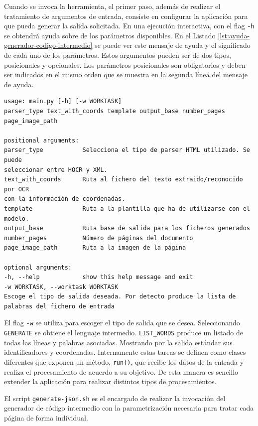 Cuando se invoca la herramienta, el primer paso, además de realizar el tratamiento de argumentos de entrada, consiste en configurar la aplicación para que pueda generar la salida solicitada. En una ejecución interactiva, con el flag \verb|-h| se obtendrá ayuda sobre de los parámetros disponibles. En el Listado \ref{lst:ayuda-generador-codigo-intermedio} se puede ver este mensaje de ayuda y el significado de cada uno de los parámetros. Estos argumentos pueden ser de dos tipos, posicionales y opcionales. Los parámetros posicionales son obligatorios y deben ser indicados en el mismo orden que se muestra en la segunda línea del mensaje de ayuda. 

\begin{lstlisting}[caption={Ayuda del generador de código intermedio.},label=lst:ayuda-generador-codigo-intermedio]
usage: main.py [-h] [-w WORKTASK]
parser_type text_with_coords template output_base number_pages page_image_path

positional arguments:
parser_type           Selecciona el tipo de parser HTML utilizado. Se puede
seleccionar entre HOCR y XML.
text_with_coords      Ruta al fichero del texto extraido/reconocido por OCR
con la información de coordenadas.
template              Ruta a la plantilla que ha de utilizarse con el
modelo.
output_base           Ruta base de salida para los ficheros generados
number_pages          Número de páginas del documento
page_image_path       Ruta a la imagen de la página

optional arguments:
-h, --help            show this help message and exit
-w WORKTASK, --worktask WORKTASK
Escoge el tipo de salida deseada. Por detecto produce la lista de palabras del fichero de entrada
\end{lstlisting}

El flag \verb|-w| se utiliza para escoger el tipo de salida que se desea. Seleccionando \verb|GENERATE| se obtiene el lenguaje intermedio. \verb|LIST_WORDS| produce un listado de todas las líneas y palabras asociadas. Mostrando por la salida estándar sus identificadores y coordenadas. Internamente estas tareas se definen como clases diferentes que exponen un método, \verb|run()|, que recibe los datos de la entrada y realiza el procesamiento de acuerdo a su objetivo. De esta manera es sencillo extender la aplicación para realizar distintos tipos de procesamientos.

El script \verb|generate-json.sh| es el encargado de realizar la invocación del generador de código intermedio con la parametrización necesaria para tratar cada página de forma individual.

